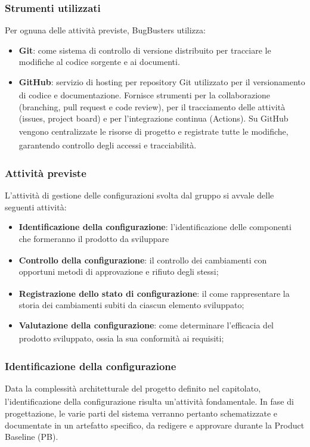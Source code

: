 \documentclass[a4paper,11pt]{article}
\newcommand{\G}{\textsubscript{\scalebox{0.6}{\textbf{G}}}}
\begin{document}
\subsubsection{Strumenti utilizzati}
Per ognuna delle attività previste, BugBusters utilizza:
\begin{itemize}
    \item \textbf{Git}: come sistema di controllo di versione distribuito per 
    tracciare le modifiche al codice sorgente e ai documenti.
    \item \textbf{GitHub\G{}}: servizio di hosting per 
    repository\G{} Git utilizzato per il versionamento\G{} di codice 
    e documentazione. Fornisce strumenti per la collaborazione (branching, pull request e code review), per il tracciamento delle attività (issues\G{}, project board) e per l'integrazione continua (Actions). Su GitHub\G{} vengono centralizzate le risorse di progetto\G{} e registrate tutte le modifiche, garantendo controllo degli accessi e tracciabilità\G{}.
\end{itemize}

\subsubsection{Attività previste}
L'attività di gestione delle configurazioni svolta dal gruppo si avvale delle seguenti attività:
\begin{itemize}
    \item \textbf{Identificazione della configurazione}: l'identificazione delle componenti che
formeranno il prodotto\G{} da sviluppare
    \item \textbf{Controllo della configurazione}: il controllo dei cambiamenti con opportuni
metodi di approvazione\G{} e rifiuto degli stessi;
    \item \textbf{Registrazione dello stato di configurazione}: il come rappresentare la storia dei
cambiamenti subiti da ciascun elemento sviluppato;
    \item \textbf{Valutazione della configurazione}: come determinare l'efficacia\G{} del prodotto\G{}
sviluppato, ossia la sua conformità ai requisiti;

\end{itemize}

\subsubsection{Identificazione della configurazione}
Data la complessità architetturale del progetto\G{} definito nel capitolato\G{}, l'identificazione della configurazione risulta un'attività fondamentale. In fase di progettazione, le varie parti del sistema verranno pertanto schematizzate e documentate in un artefatto specifico, da redigere e approvare durante la Product Baseline (PB)\G{}.
\end{document}
